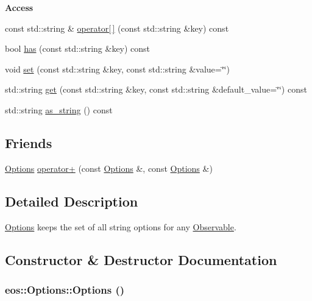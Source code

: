 \begin{Indent}{\bf Access}\par
{\em \label{_amgrpbf733d8a933c1601697f364223fc7ecb}
 }\begin{DoxyCompactItemize}
\item 
const std::string \& \hyperlink{classeos_1_1Options_a9095b57b9ffeccac5aad07412943bac9}{operator\mbox{[}$\,$\mbox{]}} (const std::string \&key) const 
\item 
bool \hyperlink{classeos_1_1Options_a84ce27abf490cf39fa5a4d1cbb835c8e}{has} (const std::string \&key) const 
\item 
void \hyperlink{classeos_1_1Options_a677e5bc4a49af527471e7c6db4a4b953}{set} (const std::string \&key, const std::string \&value=\char`\"{}\char`\"{})
\item 
std::string \hyperlink{classeos_1_1Options_a1f4e5296ad8f5135861334ce4969c4e4}{get} (const std::string \&key, const std::string \&default\_\-value=\char`\"{}\char`\"{}) const 
\item 
std::string \hyperlink{classeos_1_1Options_a1660f95dc9e5c8859783db04d5093442}{as\_\-string} () const 
\end{DoxyCompactItemize}
\end{Indent}
\subsection*{Friends}
\begin{DoxyCompactItemize}
\item 
\hyperlink{classeos_1_1Options}{Options} \hyperlink{classeos_1_1Options_a8a95ca0ac073107e9ec18e05a9ee6cce}{operator+} (const \hyperlink{classeos_1_1Options}{Options} \&, const \hyperlink{classeos_1_1Options}{Options} \&)
\end{DoxyCompactItemize}


\subsection{Detailed Description}
\hyperlink{classeos_1_1Options}{Options} keeps the set of all string options for any \hyperlink{classeos_1_1Observable}{Observable}. 

\subsection{Constructor \& Destructor Documentation}
\hypertarget{classeos_1_1Options_a41872695828e800ea0d439ded2e79ccc}{
\subsubsection[{Options}]{\setlength{\rightskip}{0pt plus 5cm}eos::Options::Options ()}}
\label{classeos_1_1Options_a41872695828e800ea0d439ded2e79ccc}


